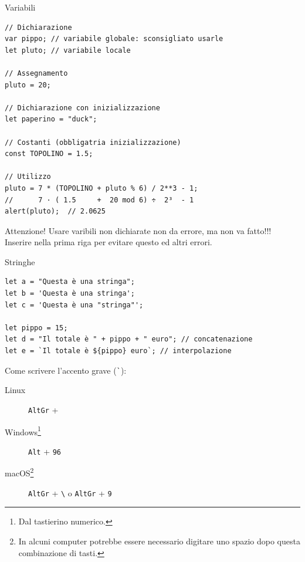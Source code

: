 \begin{frame}[fragile]{Variabili}\transfade\centering
  \begin{verbatim}
// Dichiarazione
var pippo; // variabile globale: sconsigliato usarle
let pluto; // variabile locale

// Assegnamento
pluto = 20;

// Dichiarazione con inizializzazione
let paperino = "duck";

// Costanti (obbligatria inizializzazione)
const TOPOLINO = 1.5;

// Utilizzo
pluto = 7 * (TOPOLINO + pluto % 6) / 2**3 - 1;
//      7 · ( 1.5     +  20 mod 6) ÷  2³  - 1
alert(pluto);  // 2.0625
  \end{verbatim}
  \pause
  \alert{Attenzione!} Usare varibili non dichiarate non da errore, ma non va fatto!!!\\
  Inserire nella prima riga  per evitare questo ed altri errori.\\
\end{frame}

\begin{frame}[fragile]{Stringhe}\transfade\centering
  \begin{verbatim}
let a = "Questa è una stringa";
let b = 'Questa è una stringa';
let c = 'Questa è una "stringa"';

let pippo = 15;
let d = "Il totale è " + pippo + " euro"; // concatenazione
let e = `Il totale è ${pippo} euro`; // interpolazione
  \end{verbatim}
  \bigskip
  Come scrivere l'accento grave (\texttt{\`}):
  \begin{description}
    \item[Linux] \texttt{AltGr} + \texttt{\textquotesingle}
    \item[Windows\footnote{Dal tastierino numerico.}] \texttt{Alt} + \texttt{96}
    \item[macOS\footnote{In alcuni computer potrebbe essere necessario digitare uno spazio dopo questa combinazione di tasti.}] \texttt{AltGr} + \texttt{\textbackslash} o \texttt{AltGr} + \texttt{9}
  \end{description}
\end{frame}


